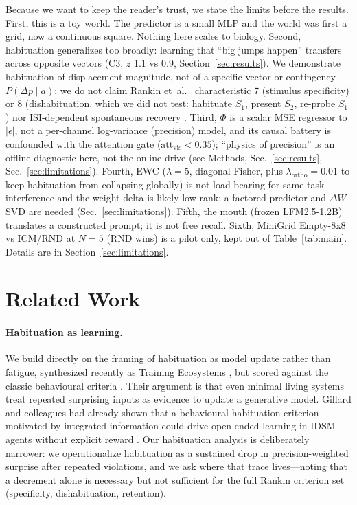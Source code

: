 \documentclass[11pt,a4paper]{article}
\begin{document}
Because we want to keep the reader's trust, we state the limits before the results. First, this is a toy world. The predictor is a small MLP and the world was first a grid, now a continuous square. Nothing here scales to biology. Second, habituation generalizes too broadly: learning that ``big jumps happen'' transfers across opposite vectors (C3, $z$ 1.1 vs 0.9, Section~\ref{sec:results}). We demonstrate habituation of displacement magnitude, not of a specific vector or contingency $P(\Delta p\mid a)$; we do not claim Rankin et~al.~\cite{rankin2009} characteristic 7 (stimulus specificity) or 8 (dishabituation, which we did not test: habituate $S_1$, present $S_2$, re-probe $S_1$) nor ISI-dependent spontaneous recovery \cite{thompson1966,rankin2009}. Third, $\Phi$ is a scalar MSE regressor to $|\epsilon|$, not a per-channel log-variance (precision) model, and its causal battery is confounded with the attention gate ($\mathrm{att}_{\mathrm{vis}}<0.35$); ``physics of precision'' is an offline diagnostic here, not the online drive (see Methods, Sec.~\ref{sec:results}, Sec.~\ref{sec:limitations}). Fourth, EWC ($\lambda=5$, diagonal Fisher, plus $\lambda_{\mathrm{ortho}}=0.01$ to keep habituation from collapsing globally) is not load-bearing for same-task interference and the weight delta is likely low-rank; a factored predictor and $\Delta W$ SVD are needed (Sec.~\ref{sec:limitations}). Fifth, the mouth (frozen LFM2.5-1.2B) translates a constructed prompt; it is not free recall. Sixth, MiniGrid Empty-8x8 vs ICM/RND at $N=5$ (RND wins) is a pilot only, kept out of Table~\ref{tab:main}. Details are in Section~\ref{sec:limitations}.

\section{Related Work}
\label{sec:related}

\paragraph{Habituation as learning.} We build directly on the framing of habituation as model update rather than fatigue, synthesized recently as Training Ecosystems \cite{levin2026}, but scored against the classic behavioural criteria \cite{thompson1966,rankin2009}. Their argument is that even minimal living systems treat repeated surprising inputs as evidence to update a generative model. Gillard and colleagues had already shown that a behavioural habituation criterion motivated by integrated information could drive open-ended learning in IDSM agents without explicit reward \cite{gillard2022}. Our habituation analysis is deliberately narrower: we operationalize habituation as a sustained drop in precision-weighted surprise after repeated violations, and we ask where that trace lives---noting that a decrement alone is necessary but not sufficient for the full Rankin criterion set (specificity, dishabituation, retention).
\end{document}
